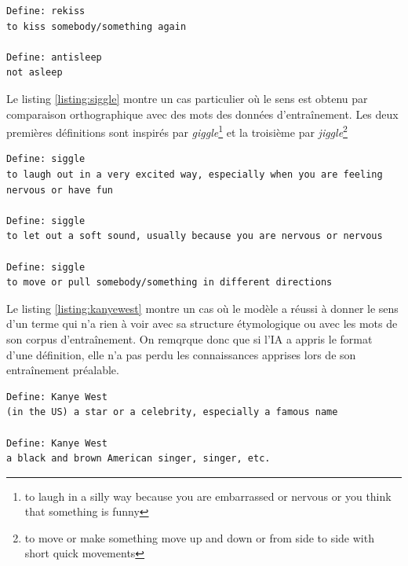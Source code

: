 \documentclass[french]{template}
\begin{document}
\begin{listing}[H]
    \begin{verbatim}
Define: rekiss
to kiss somebody/something again

Define: antisleep
not asleep
    \end{verbatim}
    \caption{Génération du modèle GPT-2 affiné pour les mots \texttt{rekiss} et \texttt{antisleep}}
    \label{listing:rekiss-antisleep}
\end{listing}

Le listing \ref{listing:siggle} montre un cas particulier où le sens est obtenu par comparaison orthographique avec des mots des données d'entraînement. Les deux premières définitions sont inspirés par \textit{giggle}\footnote{to laugh in a silly way because you are embarrassed or nervous or you think that something is funny} et la troisième par \textit{jiggle}\footnote{to move or make something move up and down or from side to side with short quick movements}

\begin{listing}[H]
    \begin{verbatim}
Define: siggle
to laugh out in a very excited way, especially when you are feeling nervous or have fun

Define: siggle
to let out a soft sound, usually because you are nervous or nervous

Define: siggle
to move or pull somebody/something in different directions
    \end{verbatim}
    \caption{Génération du modèle GPT-2 affiné pour le mot \texttt{siggle}}
    \label{listing:siggle}
\end{listing}

Le listing \ref{listing:kanyewest} montre un cas où le modèle a réussi à donner le sens d'un terme qui n'a rien à voir avec sa structure étymologique ou avec les mots de son corpus d'entraînement. On remqrque donc que si l'IA a appris le format d'une définition, elle n'a pas perdu les connaissances apprises lors de son entraînement préalable.

\begin{listing}[H]
    \begin{verbatim}
Define: Kanye West
(in the US) a star or a celebrity, especially a famous name

Define: Kanye West
a black and brown American singer, singer, etc.
    \end{verbatim}
    \caption{Génération du modèle GPT-2 affiné pour le terme \texttt{Kanye West}}
    \label{listing:kanyewest}
\end{listing}
\end{document}

